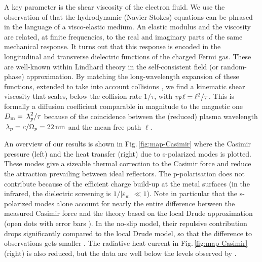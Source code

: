 \documentclass[11pt, oneside]{article}   	%
\newcommand{\lambdabar}{{\mkern+04mu\mathchar'26\mkern-09mu\lambda}}
\newcommand{\bulk}[1]{_{\mathrm{#1}}}
\def\OmegaP{\Omega_{p}}
\begin{document}
A key parameter is the shear viscosity of the electron fluid. We use the observation of 
\citet{Conti_1999}
that the hydrodynamic (Navier-Stokes) equations can be phrased in the language of 
a visco-elastic medium. 
An elastic modulus and the viscosity are related, 
at finite frequencies, to the real and imaginary parts of the same mechanical response.
It turns out that this response is encoded in the longitudinal and transverse
dielectric functions of the charged Fermi gas. These are well-known within Lindhard
theory \citep{Lindhard_1954} in the self-consistent field (or random-phase) approximation.
By matching the long-wavelength expansion of these functions, extended to take into
account collisions \citep{Kliewer_1969a, Mermin_1970, Conti_1999}, 
we find a kinematic shear viscosity that scales, below the collision rate $1/\tau$,
with $v_{\rm F} \ell = \ell^2 / \tau$. This is formally a diffusion coefficient comparable 
in magnitude to
the magnetic one $D\bulk{m} = \lambdabar_p^2 / \tau$ because of the coincidence
between the (reduced) plasma wavelength $\lambdabar_p = c / \OmegaP = 22\,{\rm nm}$ 
and the mean free path $\ell$.

An overview of our results is shown in Fig.\,\ref{fig:map-Casimir}
where the Casimir pressure (left) and the heat transfer (right) due to s-polarized modes
is plotted. 
{These modes give a sizeable
thermal correction to the Casimir force \citep{Bostrom_2000b, Torgerson_2004, Intravaia_2009a}
and reduce the attraction prevailing between ideal reflectors.
The p-polarisation does not contribute because of the efficient charge build-up at the metal surfaces
(in the infrared, the dielectric screening is $1/|\varepsilon\bulk{m}| \ll 1$). 
Note in particular that the s-polarized modes alone account for nearly 
the entire difference between the measured Casimir force and the theory based 
on the local Drude approximation (open dots with error bars \citep{Decca_2005}).
In the no-slip model, their
repulsive contribution drops significantly compared to the local Drude model, 
so that the difference to observations gets smaller \citep{Klimchitskaya_2020b}.}
The radiative heat current in Fig.\,\ref{fig:map-Casimir}\,(right) is also reduced, but
the data are well below the levels observed by \citet{Kloppstech_2017, Cui_2017a}.
\end{document}
